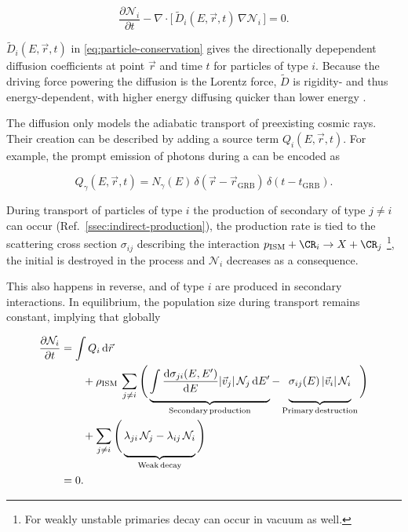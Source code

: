 \begin{equation}
\label{eq:particle-conservation}
\frac{\partial\mathcal{N}_i}{\partial t} - \nabla \cdot \bigg[\,\widetilde{D}_i(E,\vec{r}, t)\,\nabla\mathcal{N}_i\,\bigg] = 0.
\end{equation}

$\widetilde{D}_i(E,\vec{r}, t)$ in \cref{eq:particle-conservation} gives the 
directionally depependent diffusion coefficients at point $\vec{r}$ and time 
$t$ for particles of type $i$. Because the driving force powering the diffusion
is the Lorentz force, $\widetilde{D}$ is rigidity- and thus energy-dependent, 
with higher energy \CRs diffusing quicker than lower energy \CRs.

The diffusion only models the adiabatic transport of preexisting cosmic rays.
Their creation can be described by adding a source term $Q_i(E, \vec{r}, t)$. 
For example, the prompt emission of \UHE photons during a \GRB can be encoded 
as

\begin{equation}
\label{eq:grb-source-term}
Q_\gamma(E, \vec{r}, t) = N_\gamma(E) \, \delta(\vec{r}-\vec{r}_\mathrm{GRB}) \, \delta(t-t_\mathrm{GRB}).
\end{equation}

During transport of particles of type $i$ the production of secondary \CRs of 
type $j\neq i$ can occur (Ref.\ \cref{ssec:indirect-production}), the 
production rate is tied to the scattering cross section $\sigma_{ij}$ 
describing the interaction $p_\mathrm{ISM} + \CR_i \rightarrow X + \CR_j$
\footnote{For weakly unstable primaries decay can occur in vacuum as well.}, 
the initial \CR is destroyed in the process and $\mathcal{N}_i$ decreases as a 
consequence.

This also happens in reverse, and \CRs of type $i$ are produced in secondary 
interactions. In equilibrium, the population size during transport remains 
constant, implying that globally

\begin{align}
\frac{\partial \mathcal{N}_i}{\partial t} &= \int Q_i \, \mathrm{d}\vec{r} \nonumber \\
					    &\qquad + \rho_\mathrm{ISM} \, \sum\limits_{j\neq i} \Bigg(\underbrace{\int \frac{\mathrm{d}\sigma_{ji}(E, E')}{\mathrm{d}E} |\vec{v}_j| \, \mathcal{N}_j \, \mathrm{d}E' \vphantom{\Bigg[}}_\mathrm{Secondary\,production} - \underbrace{\sigma_{ij}(E) \, |\vec{v}_i|\, \mathcal{N}_i \vphantom{\Bigg[}}_\mathrm{Primary\,destruction} \Bigg) \nonumber \\
					    &\qquad + \sum\limits_{j\neq i} \Bigg(\underbrace{\lambda_{ji}\,\mathcal{N}_j - \lambda_{ij}\,\mathcal{N}_i \vphantom{\Bigg[}}_\mathrm{Weak\,decay}\Bigg) \nonumber \\
					    &= 0. \label{eq:secondary-equilibrium}
\end{align}


